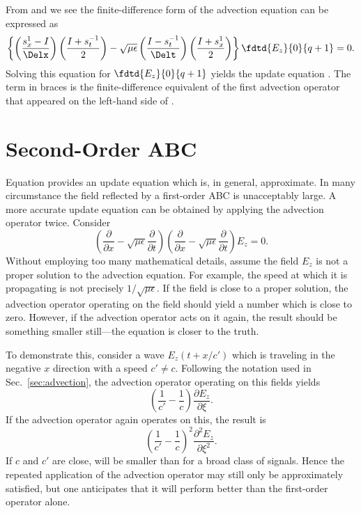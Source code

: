 From  and  we
see the finite-difference form of the advection equation can be
expressed as
\begin{equation}
   \left\{\left(\frac{s_x^{1}-I}{\Delx}\right)
         \left(\frac{I+s_t^{-1}}{2}\right) -
    \sqrt{\mu\epsilon}
    \left(\frac{I-s_t^{-1}}{\Delt}\right)
    \left(\frac{I+s_x^{1}}{2}\right)\right\}
    \fdtd{E_z}{0}{q+1} = 0.
   \label{eq:advectionOperator}
\end{equation}
Solving this equation for $\fdtd{E_z}{0}{q+1}$ yields the update
equation .  The term in braces is the
finite-difference equivalent of the first advection operator that
appeared on the left-hand side of .

\section{Second-Order ABC \label{sec:secondOrderABC}}

Equation  provides an update equation
which is, in general, approximate.  In many circumstance the field
reflected by a first-order ABC is unacceptably large.  A more accurate
update equation can be obtained by applying the advection operator
twice.  Consider 
\begin{equation}
  \left(\frac{\partial }{\partial x}
  -\sqrt{\mu\epsilon} \frac{\partial }{\partial t}\right)
  \left(\frac{\partial }{\partial x}
  -\sqrt{\mu\epsilon} \frac{\partial }{\partial t}\right)
  E_z
  = 0.
  \label{eq:advectionSecond}
\end{equation}
Without employing too many mathematical details, assume the field
$E_z$ is not a proper solution to the advection equation.  For
example, the speed at which it is propagating is not precisely
$1/\sqrt{\mu\epsilon}$.  If the field is close to a proper solution,
the advection operator operating on the field should yield a number
which is close to zero.  However, if the advection operator acts on it
again, the result should be something smaller still---the equation is
closer to the truth.  

To demonstrate this, consider a wave $E_z(t+x/c')$ which is traveling
in the negative $x$ direction with a speed $c'\neq c$.  Following the
notation used in Sec.\ \ref{sec:advection}, the advection operator
operating on this fields yields
\begin{equation}
  \left(\frac{1}{c'} - \frac{1}{c}\right)
  \frac{\partial E_z}{\partial \xi}.
  \label{eq:advectionResidue}
\end{equation}
If the advection operator again operates on this, the result is
\begin{equation}
  \left(\frac{1}{c'} - \frac{1}{c}\right)^2
  \frac{\partial^2 E_z}{\partial \xi^2}.
  \label{eq:advectionResidueI}
\end{equation}
If $c$ and $c'$ are close,  will be smaller
than  for a broad class of signals.  Hence
the repeated application of the advection operator may still only be
approximately satisfied, but one anticipates that it will perform
better than the first-order operator alone.

